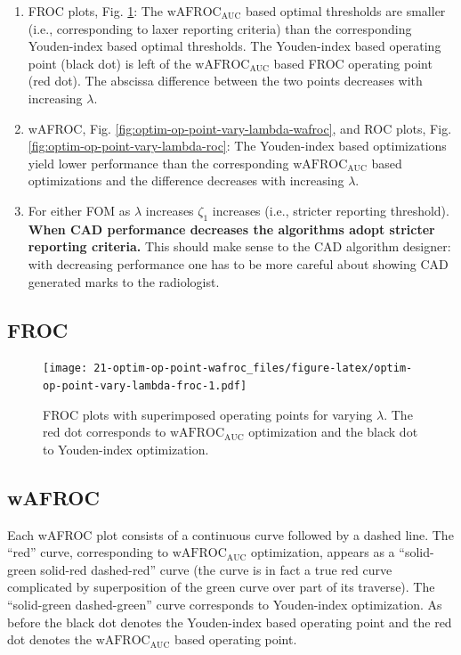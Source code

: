 \documentclass[
]{book}
\begin{document}
\begin{enumerate}
\def\labelenumi{\arabic{enumi}.}
\item
  FROC plots, Fig. \ref{fig:optim-op-point-vary-lambda-froc}: The \(\text{wAFROC}_\text{AUC}\) based optimal thresholds are smaller (i.e., corresponding to laxer reporting criteria) than the corresponding Youden-index based optimal thresholds. The Youden-index based operating point (black dot) is left of the \(\text{wAFROC}_\text{AUC}\) based FROC operating point (red dot). The abscissa difference between the two points decreases with increasing \(\lambda\).
\item
  wAFROC, Fig. \ref{fig:optim-op-point-vary-lambda-wafroc}, and ROC plots, Fig. \ref{fig:optim-op-point-vary-lambda-roc}: The Youden-index based optimizations yield lower performance than the corresponding \(\text{wAFROC}_\text{AUC}\) based optimizations and the difference decreases with increasing \(\lambda\).
\item
  For either FOM as \(\lambda\) increases \(\zeta_1\) increases (i.e., stricter reporting threshold). \textbf{When CAD performance decreases the algorithms adopt stricter reporting criteria.} This should make sense to the CAD algorithm designer: with decreasing performance one has to be more careful about showing CAD generated marks to the radiologist.
\end{enumerate}

\hypertarget{froc-1}{%
\subsection{FROC}\label{froc-1}}

\begin{figure}
\centering
\texttt{[image: 21-optim-op-point-wafroc\_files/figure-latex/optim-op-point-vary-lambda-froc-1.pdf]}
\caption{\label{fig:optim-op-point-vary-lambda-froc}FROC plots with superimposed operating points for varying \(\lambda\). The red dot corresponds to \(\text{wAFROC}_\text{AUC}\) optimization and the black dot to Youden-index optimization.}
\end{figure}

\hypertarget{wafroc-1}{%
\subsection{wAFROC}\label{wafroc-1}}

Each wAFROC plot consists of a continuous curve followed by a dashed line. The ``red'' curve, corresponding to \(\text{wAFROC}_\text{AUC}\) optimization, appears as a ``solid-green solid-red dashed-red'' curve (the curve is in fact a true red curve complicated by superposition of the green curve over part of its traverse). The ``solid-green dashed-green'' curve corresponds to Youden-index optimization. As before the black dot denotes the Youden-index based operating point and the red dot denotes the \(\text{wAFROC}_\text{AUC}\) based operating point.
\end{document}
